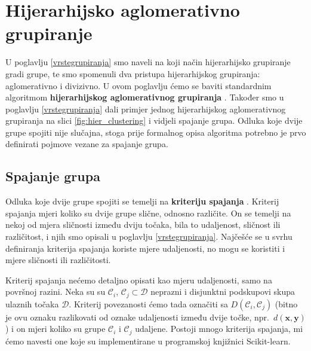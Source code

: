 \documentclass[times, utf8, zavrsni]{fer}
\begin{document}
\section{Hijerarhijsko aglomerativno grupiranje}
U poglavlju \ref{vrstegrupiranja} smo naveli na koji način hijerarhijsko grupiranje gradi grupe, te smo spomenuli dva pristupa hijerarhijskog grupiranja: aglomerativno i divizivno. U ovom poglavlju ćemo se baviti standardnim algoritmom \textbf{hijerarhijskog aglomerativnog grupiranja} . Također smo u poglavlju \ref{vrstegrupiranja} dali primjer jednog hijerarhijskog aglomerativnog grupiranja na slici \ref{fig:hier_clustering} i vidjeli spajanje grupa. Odluka koje dvije grupe spojiti nije slučajna, stoga prije formalnog opisa algoritma potrebno je prvo definirati pojmove vezane za spajanje grupa.

\subsection{Spajanje grupa}
Odluka koje dvije grupe spojiti se temelji na \textbf{kriteriju spajanja} . Kriterij spajanja mjeri koliko su dvije grupe slične, odnosno različite. On se temelji na nekoj od mjera sličnosti između dviju točaka, bila to udaljenost, sličnost ili različitost, i njih smo opisali u poglavlju \ref{vrstegrupiranja}. Najčešće se u svrhu definiranja kriterija spajanja koriste mjere udaljenosti, no mogu se koristiti i mjere sličnosti ili različitosti.

Kriterij spajanja nećemo detaljno opisati kao mjeru udaljenosti, samo na površnoj razini. Neka su su $\mathcal{C}_i$, $\mathcal{C}_j \subset \mathcal{D}$ neprazni i disjunktni podskupovi skupa ulaznih točaka $\mathcal{D}$. Kriterij povezanosti ćemo tada označiti sa $D \left(\mathcal{C}_i, \mathcal{C}_j\right)$ (bitno je ovu oznaku razlikovati od oznake udaljenosti između dvije točke, npr.\ $d \left(\mathbf{x}, \mathbf{y}\right)$) i on mjeri koliko su grupe $\mathcal{C}_i$ i $\mathcal{C}_j$ udaljene. Postoji mnogo kriterija spajanja, mi ćemo navesti one koje su implementirane u programskoj knjižnici Scikit-learn.
\end{document}
